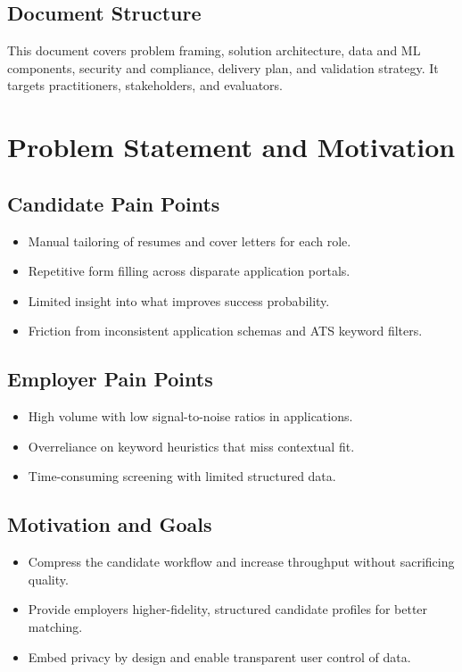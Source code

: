 \documentclass[12pt,a4paper]{article}
\begin{document}
\subsection{Document Structure}
This document covers problem framing, solution architecture, data and ML components, security and compliance, delivery plan, and validation strategy. It targets practitioners, stakeholders, and evaluators.

\section{Problem Statement and Motivation}
\subsection{Candidate Pain Points}
\begin{itemize}[leftmargin=2em]
  \item Manual tailoring of resumes and cover letters for each role.
  \item Repetitive form filling across disparate application portals.
  \item Limited insight into what improves success probability.
  \item Friction from inconsistent application schemas and ATS keyword filters.
\end{itemize}
\subsection{Employer Pain Points}
\begin{itemize}[leftmargin=2em]
  \item High volume with low signal-to-noise ratios in applications.
  \item Overreliance on keyword heuristics that miss contextual fit.
  \item Time-consuming screening with limited structured data.
\end{itemize}
\subsection{Motivation and Goals}
\begin{itemize}[leftmargin=2em]
  \item Compress the candidate workflow and increase throughput without sacrificing quality.
  \item Provide employers higher-fidelity, structured candidate profiles for better matching.
  \item Embed privacy by design and enable transparent user control of data.
\end{itemize}
\end{document}
